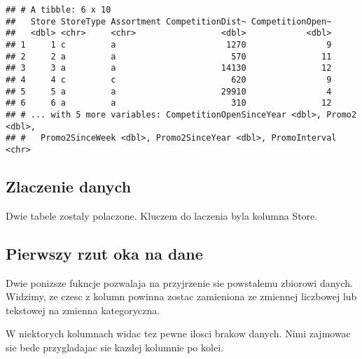 \documentclass[]{article}
\newenvironment{Shaded}{\begin{snugshade}}{\end{snugshade}}
\newcommand{\DataTypeTok}[1]{\textcolor[rgb]{0.13,0.29,0.53}{#1}}
\newcommand{\KeywordTok}[1]{\textcolor[rgb]{0.13,0.29,0.53}{\textbf{#1}}}
\newcommand{\NormalTok}[1]{#1}
\newcommand{\OperatorTok}[1]{\textcolor[rgb]{0.81,0.36,0.00}{\textbf{#1}}}
\newcommand{\StringTok}[1]{\textcolor[rgb]{0.31,0.60,0.02}{#1}}
\begin{document}
\begin{verbatim}
## # A tibble: 6 x 10
##   Store StoreType Assortment CompetitionDist~ CompetitionOpen~
##   <dbl> <chr>     <chr>                 <dbl>            <dbl>
## 1     1 c         a                      1270                9
## 2     2 a         a                       570               11
## 3     3 a         a                     14130               12
## 4     4 c         c                       620                9
## 5     5 a         a                     29910                4
## 6     6 a         a                       310               12
## # ... with 5 more variables: CompetitionOpenSinceYear <dbl>, Promo2 <dbl>,
## #   Promo2SinceWeek <dbl>, Promo2SinceYear <dbl>, PromoInterval <chr>
\end{verbatim}

\hypertarget{zlaczenie-danych}{%
\subsection{Zlaczenie danych}\label{zlaczenie-danych}}

Dwie tabele zostaly polaczone. Kluczem do laczenia byla kolumna Store.

\begin{Shaded}
\end{Shaded}

\hypertarget{pierwszy-rzut-oka-na-dane}{%
\subsection{Pierwszy rzut oka na dane}\label{pierwszy-rzut-oka-na-dane}}

Dwie ponizsze fukncje pozwalaja na przyjrzenie sie powstalemu zbiorowi
danych. Widzimy, ze czesc z kolumn powinna zostac zamieniona ze zmiennej
liczbowej lub tekstowej na zmienna kategoryczna.

W niektorych kolumnach widac tez pewne ilosci brakow danych. Nimi
zajmowac sie bede przygladajac sie kazdej kolumnie po kolei.

\begin{Shaded}
\end{Shaded}
\end{document}
